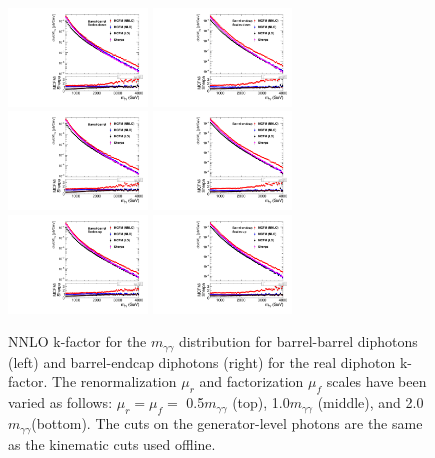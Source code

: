 \begin{figure}[htbp!]
\caption{NNLO k-factor for the $m_{\gamma\gamma}$ distribution for barrel-barrel
  diphotons (left) and barrel-endcap diphotons (right) for the real diphoton k-factor. The
  renormalization $\mu_{r}$ and factorization $\mu_{f}$ scales have been varied as follows: $\mu_{r}=\mu_{f}=$ 0.5$m_{\gamma\gamma}$ (top), 1.0$m_{\gamma\gamma}$ (middle), and 2.0$m_{\gamma\gamma}$(bottom). The cuts on the generator-level photons are the same as the kinematic cuts used offline.}
\begin{center}
\includegraphics[angle=0,width=0.33\textwidth]{fig/BB_hist1_R0p5F0p5_125GeV_NNPDF.pdf}
\includegraphics[angle=0,width=0.33\textwidth]{fig/BE_hist1_R0p5F0p5_125GeV_NNPDF.pdf}
\includegraphics[angle=0,width=0.33\textwidth]{fig/BB_hist1_R1F1_125GeV_NNPDF.pdf}
\includegraphics[angle=0,width=0.33\textwidth]{fig/BE_hist1_R1F1_125GeV_NNPDF.pdf}
\includegraphics[angle=0,width=0.33\textwidth]{fig/BB_hist1_R2F2_125GeV_NNPDF.pdf}
\includegraphics[angle=0,width=0.33\textwidth]{fig/BE_hist1_R2F2_125GeV_NNPDF.pdf}
\end{center}
\label{fig:kfactor_mgg}
\end{figure}

